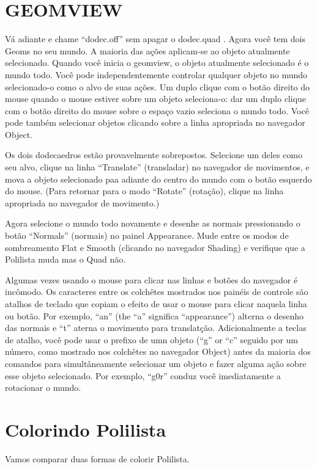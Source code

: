 \documentclass[12pt,a4paper]{book}
\begin{document}
\section{GEOMVIEW}

Vá adiante e chame ``dodec.off'' sem apagar o dodec.quad .  Agora
você tem dois Geoms no seu mundo.  A maioria das ações aplicam-se ao
objeto atualmente selecionado. Quando você inicia o geomview, o objeto
atualmente selecionado é o mundo todo. Você pode independentemente controlar qualquer
objeto no mundo selecionado-o como o alvo de suas ações.
Um duplo clique com o botão direito do mouse quando o mouse estiver sobre um
objeto seleciona-o: dar um duplo clique com o botão direito do mouse sobre o espaço vazio
seleciona o mundo todo. Você pode também selecionar objetos clicando sobre a
linha apropriada no navegador Object.

Os dois dodecaedros estão provavelmente sobrepostos.  Selecione um deles como
seu alvo, clique na linha ``Translate'' (transladar) no navegador de movimentos, e
mova a objeto selecionado paa adiante do centro do mundo com o botão esquerdo
do mouse.  (Para retornar para o modo ``Rotate'' (rotação), clique na linha apropriada no
navegador de movimento.)
 
Agora selecione o mundo todo novamente e desenhe as normais pressionando o
botão ``Normals'' (normais) no painel Appearance. Mude entre os modos de sombreamento
Flat e Smooth (clicando no navegador Shading) e verifique
que a Polilista muda mas o Quad não.  

Algumas vezes usando o mouse para clicar nas linhas e botões do navegador é
incômodo. Os caracteres entre os colchêtes mostrados nos painéis de controle são
atalhos de teclado que copiam o efeito de usar o mouse para
clicar naquela linha ou botão. Por exemplo, ``an'' (the ``a'' significa
``appearance'') alterna o desenho das normais e ``t'' aterna o movimento para
translatção.  Adicionalmente a teclas de atalho, você pode usar o prefixo de umn
objeto (``g'' or ``c'' seguido por um número, como mostrado nos colchêtes no
navegador Object) antes da maioria dos comandos para simultâneamente selecionar um objeto
e fazer alguma ação sobre esse objeto selecionado. Por exemplo, ``g0r'' conduz você imediatamente
a rotacionar o mundo.

\section{Colorindo Polilista}

Vamos comparar duas formas de colorir Polilista.
\end{document}
